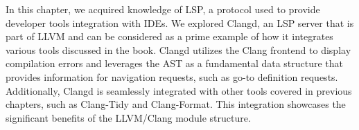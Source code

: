 In this chapter, we acquired knowledge of LSP, a protocol used to provide developer tools integration with IDEs. We explored Clangd, an LSP server that is part of LLVM and can be considered as a prime example of how it integrates various tools discussed in the book. Clangd utilizes the Clang frontend to display compilation errors and leverages the AST as a fundamental data structure that provides information for navigation requests, such as go-to definition requests. Additionally, Clangd is seamlessly integrated with other tools covered in previous chapters, such as Clang-Tidy and Clang-Format. This integration showcases the significant benefits of the LLVM/Clang module structure.